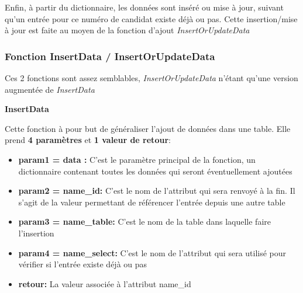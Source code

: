 Enfin, à partir du dictionnaire, les données sont inséré ou mise à jour, suivant qu'un entrée pour ce numéro de candidat existe déjà ou pas.
Cette insertion/mise à jour est faite au moyen de la fonction d'ajout \textit{InsertOrUpdateData}





\subsubsection{Fonction InsertData / InsertOrUpdateData}

Ces 2 fonctions sont assez semblables, \textit{InsertOrUpdateData} n'étant qu'une version augmentée de \textit{InsertData}

\textbf{InsertData}


Cette fonction à pour but de généraliser l'ajout de données dans une table. Elle prend \textbf{4 paramètres} et \textbf{1 valeur de retour}:

\begin{itemize}
    \item \textbf{param1 = data :} C'est le paramètre principal de la fonction, un dictionnaire contenant toutes les données qui seront éventuellement ajoutées 
    \item \textbf{param2 = name\_id:} C'est le nom de l'attribut qui sera renvoyé à la fin. Il s'agit de la valeur permettant de référencer l'entrée depuis une autre table 
    \item \textbf{param3 = name\_table:} C'est le nom de la table dans laquelle faire l'insertion
    \item \textbf{param4 = name\_select:} C'est le nom de l'attribut qui sera utilisé pour vérifier si l'entrée existe déjà ou pas
    \item \textbf{retour:} La valeur associée à l'attribut name\_id
\end{itemize}



